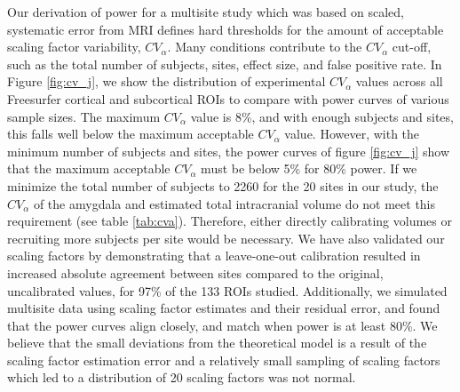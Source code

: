 Our derivation of power for a multisite study which was based on scaled, systematic error from MRI defines hard thresholds for the amount of acceptable scaling factor variability, $CV_{\alpha}$. Many conditions contribute to the $CV_{\alpha}$ cut-off, such as the total number of subjects, sites, effect size, and false positive rate. In Figure \ref{fig:cv_j}, we show the distribution of experimental $CV_{\alpha}$ values across all Freesurfer cortical and subcortical ROIs to compare with power curves of various sample sizes. The maximum $CV_{\alpha}$ value is 8\%, and with enough subjects and sites, this falls well below the maximum acceptable $CV_{\alpha}$ value. However, with the minimum number of subjects and sites, the power curves of figure \ref{fig:cv_j} show that the maximum acceptable $CV_{\alpha}$ must be below 5\% for 80\% power. If we minimize the total number of subjects to 2260 for the 20 sites in our study, the $CV_{\alpha}$ of the amygdala and estimated total intracranial volume do not meet this requirement (see table \ref{tab:cva}). Therefore, either directly calibrating volumes or recruiting more subjects per site  would be necessary. We have also validated our scaling factors by demonstrating that a leave-one-out calibration resulted in increased absolute agreement between sites compared to the original, uncalibrated values, for 97\% of the 133 ROIs studied. Additionally, we simulated multisite data using scaling factor estimates and their residual error, and found that the power curves align closely, and match when power is at least 80\%. We believe that the small deviations from the theoretical model is a result of the scaling factor estimation error and a relatively small sampling of scaling factors which led to a distribution of 20 scaling factors was not normal.  